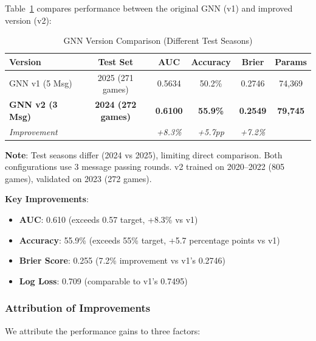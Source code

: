 Table~\ref{tab:gnn_v1_v2} compares performance between the original GNN (v1) and improved version (v2):

\begin{table}[htbp]
\centering
\caption{GNN Version Comparison (Different Test Seasons)}
\label{tab:gnn_v1_v2}
\small
\begin{tabular}{@{}lccccc@{}}
\toprule
\textbf{Version} & \textbf{Test Set} & \textbf{AUC} & \textbf{Accuracy} & \textbf{Brier} & \textbf{Params} \\
\midrule
GNN v1 (5 Msg) & 2025 (271 games) & 0.5634 & 50.2\% & 0.2746 & 74,369 \\
\textbf{GNN v2 (3 Msg)} & \textbf{2024 (272 games)} & \textbf{0.6100} & \textbf{55.9\%} & \textbf{0.2549} & \textbf{79,745} \\
\midrule
\textit{Improvement} & & \textit{+8.3\%} & \textit{+5.7pp} & \textit{+7.2\%} & \\
\bottomrule
\end{tabular}

\vspace{0.5em}
\footnotesize
\textbf{Note}: Test seasons differ (2024 vs 2025), limiting direct comparison. Both configurations use 3 message passing rounds. v2 trained on 2020--2022 (805 games), validated on 2023 (272 games).
\end{table}

\textbf{Key Improvements}:
\begin{itemize}[noitemsep]
    \item \textbf{AUC}: 0.610 (exceeds 0.57 target, +8.3\% vs v1)
    \item \textbf{Accuracy}: 55.9\% (exceeds 55\% target, +5.7 percentage points vs v1)
    \item \textbf{Brier Score}: 0.255 (7.2\% improvement vs v1's 0.2746)
    \item \textbf{Log Loss}: 0.709 (comparable to v1's 0.7495)
\end{itemize}

\subsubsection{Attribution of Improvements}
\label{subsubsec:gnn_improvement_attribution}

We attribute the performance gains to three factors:

